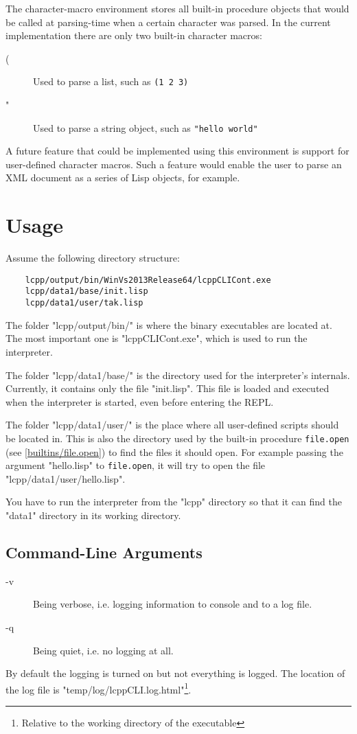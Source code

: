 \documentclass[a4paper]{scrartcl}
\newcommand{\lisp}{Lisp}
\begin{document}
	The character-macro environment stores all built-in procedure objects that would be called at parsing-time when a certain character was parsed. In the current implementation there are only two built-in character macros:
	\begin{description}
		\item[(] Used to parse a list, such as \lstinline|(1 2 3)|
		\item["] Used to parse a string object, such as \lstinline|"hello world"|
	\end{description}

	A future feature that could be implemented using this environment is support for user-defined character macros. Such a feature would enable the user to parse an XML document as a series of \lisp{} objects, for example.

\section{Usage}
\label{usage}
	Assume the following directory structure:
	\begin{lstlisting}
	lcpp/output/bin/WinVs2013Release64/lcppCLICont.exe
	lcpp/data1/base/init.lisp
	lcpp/data1/user/tak.lisp
	\end{lstlisting}

	The folder "lcpp/output/bin/" is where the binary executables are located at. The most important one is "lcppCLICont.exe", which is used to run the interpreter.

	The folder "lcpp/data1/base/" is the directory used for the interpreter's internals. Currently, it contains only the file "init.lisp". This file is loaded and executed when the interpreter is started, even before entering the REPL.

	The folder "lcpp/data1/user/" is the place where all user-defined scripts should be located in. This is also the directory used by the built-in procedure \lstinline|file.open| (see \ref{builtins/file.open}) to find the files it should open. For example passing the argument "hello.lisp" to \lstinline|file.open|, it will try to open the file "lcpp/data1/user/hello.lisp".

	You have to run the interpreter from the "lcpp" directory so that it can find the "data1" directory in its working directory.

\subsection{Command-Line Arguments}
\label{usage/cmd-args}
	\begin{description}
		\item[-v] Being verbose, i.e. logging information to console and to a log file.
		\item[-q] Being quiet, i.e. no logging at all.
	\end{description}
	By default the logging is turned on but not everything is logged. The location of the log file is "temp/log/lcppCLI.log.html"\footnote{Relative to the working directory of the executable}.
\end{document}
